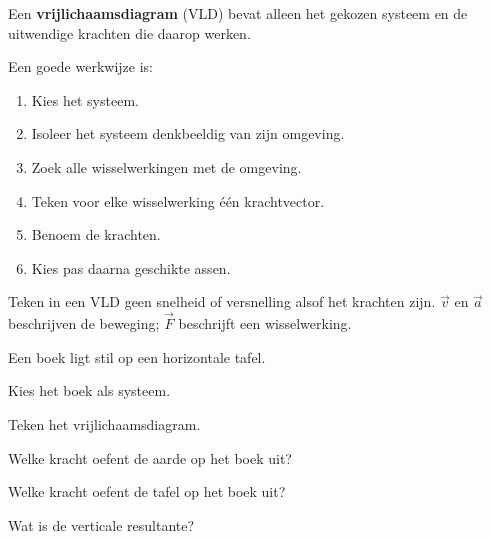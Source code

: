 \documentclass{ximera}
\begin{document}
Een \textbf{vrijlichaamsdiagram} (VLD) bevat alleen het gekozen systeem
en de uitwendige krachten die daarop werken.

Een goede werkwijze is:

\begin{enumerate}
  \item Kies het systeem.
  \item Isoleer het systeem denkbeeldig van zijn omgeving.
  \item Zoek alle wisselwerkingen met de omgeving.
  \item Teken voor elke wisselwerking één krachtvector.
  \item Benoem de krachten.
  \item Kies pas daarna geschikte assen.
\end{enumerate}

\begin{opmerking}
Teken in een VLD geen snelheid of versnelling alsof het krachten zijn.
$\vec v$ en $\vec a$ beschrijven de beweging; $\vec F$ beschrijft een
wisselwerking.
\end{opmerking}


\begin{oefening}{\oefB\ESS}

Een boek ligt stil op een horizontale tafel.

\begin{question}
Kies het boek als systeem.
\end{question}

\begin{question}
Teken het vrijlichaamsdiagram.
\end{question}

\begin{question}
Welke kracht oefent de aarde op het boek uit?
\end{question}

\begin{question}
Welke kracht oefent de tafel op het boek uit?
\end{question}

\begin{question}
Wat is de verticale resultante?
\end{question}

\end{oefening}


\end{document}
